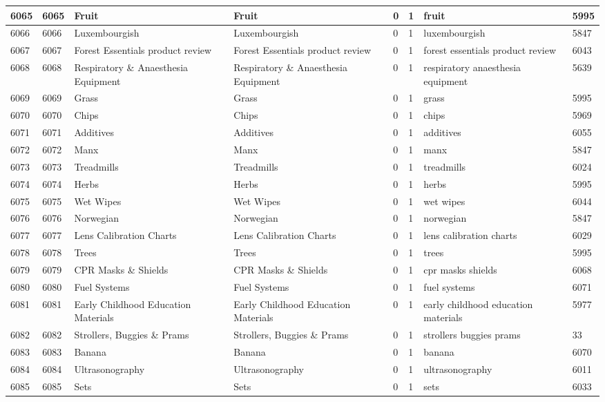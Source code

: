 \begin{longtable}{|l|l|l|l|l|l|l|l|}
6065 & 6065 & Fruit & Fruit & 0 & 1 & fruit & 5995 \\ \hline 
6066 & 6066 & Luxembourgish & Luxembourgish & 0 & 1 & luxembourgish & 5847 \\ \hline 
6067 & 6067 & Forest Essentials product review & Forest Essentials product review & 0 & 1 & forest essentials product review & 6043 \\ \hline 
6068 & 6068 & Respiratory \& Anaesthesia Equipment & Respiratory \& Anaesthesia Equipment & 0 & 1 & respiratory anaesthesia equipment & 5639 \\ \hline 
6069 & 6069 & Grass & Grass & 0 & 1 & grass & 5995 \\ \hline 
6070 & 6070 & Chips & Chips & 0 & 1 & chips & 5969 \\ \hline 
6071 & 6071 & Additives & Additives & 0 & 1 & additives & 6055 \\ \hline 
6072 & 6072 & Manx & Manx & 0 & 1 & manx & 5847 \\ \hline 
6073 & 6073 & Treadmills & Treadmills & 0 & 1 & treadmills & 6024 \\ \hline 
6074 & 6074 & Herbs & Herbs & 0 & 1 & herbs & 5995 \\ \hline 
6075 & 6075 & Wet Wipes & Wet Wipes & 0 & 1 & wet wipes & 6044 \\ \hline 
6076 & 6076 & Norwegian & Norwegian & 0 & 1 & norwegian & 5847 \\ \hline 
6077 & 6077 & Lens Calibration Charts & Lens Calibration Charts & 0 & 1 & lens calibration charts & 6029 \\ \hline 
6078 & 6078 & Trees & Trees & 0 & 1 & trees & 5995 \\ \hline 
6079 & 6079 & CPR Masks \& Shields & CPR Masks \& Shields & 0 & 1 & cpr masks shields & 6068 \\ \hline 
6080 & 6080 & Fuel Systems & Fuel Systems & 0 & 1 & fuel systems & 6071 \\ \hline 
6081 & 6081 & Early Childhood Education Materials & Early Childhood Education Materials & 0 & 1 & early childhood education materials & 5977 \\ \hline 
6082 & 6082 & Strollers, Buggies \& Prams & Strollers, Buggies \& Prams & 0 & 1 & strollers buggies prams & 33 \\ \hline 
6083 & 6083 & Banana & Banana & 0 & 1 & banana & 6070 \\ \hline 
6084 & 6084 & Ultrasonography & Ultrasonography & 0 & 1 & ultrasonography & 6011 \\ \hline 
6085 & 6085 & Sets & Sets & 0 & 1 & sets & 6033 \\ \hline 

\end{longtable}
